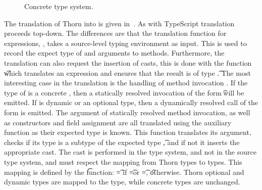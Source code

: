 \documentclass[runnningheads]{tex/llncs}
\begin{document}
\begin{figure}[hb]	
	
	\hrulefill  
	\vspace{0.5mm}
	
	\begin{mathpar}  
	\end{mathpar}
	
	\hrulefill
	\caption{Concrete type system.}\label{thts2}
\end{figure}	

The translation of Thorn into \kafka is given in~. As with
TypeScript translation proceeds top-down. The differences are that the
translation function for expressions, \TRG{\e}\Env, takes a source-level
typing environment as input. This is used to record the expect type of \this
and arguments \x to methods. Furthermore, the translation can also request
the insertion of casts, this is done with the function \TAG{\e}\Env\t which
translates an expression and ensures that the result is of type \t. The most
interesting case in the translation is the handling of method invocation
\Call\e\m\ep. If the type of \e is a concrete \C, then a statically resolved
invocation of the form \KCall\e\m\ep\t\tp will be emitted. If \e is dynamic
or an optional type, then a dynamically resolved call of the form
\DynCall\e\m\ep is emitted.  The argument of statically resolved method
invocation, as well as constructors and field assignment are all translated
using the auxiliary function as their expected type is known.  This function
translates its argument, checks if its type is a subtype of the expected
type \t, and if not it inserts the appropriate cast.  The cast is performed
in the \kafka type system, and not in the source type system, and must
respect the mapping from Thorn types to \kafka types.  This mapping is
defined by the \kty\t function: \kty\t = \any if \t=\dt\C or \t=\any, \t
otherwise.  Thorn optional and dynamic types are mapped to the \any type,
while concrete types are unchanged.
\end{document}
